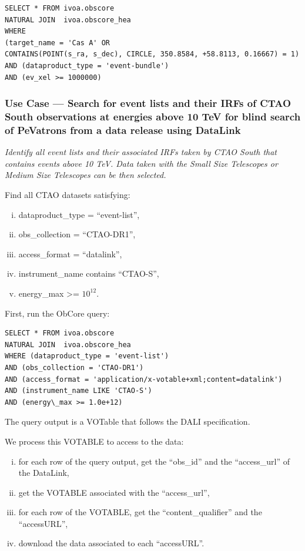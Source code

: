 \begin{verbatim}
SELECT * FROM ivoa.obscore
NATURAL JOIN  ivoa.obscore_hea
WHERE
(target_name = 'Cas A' OR
CONTAINS(POINT(s_ra, s_dec), CIRCLE, 350.8584, +58.8113, 0.16667) = 1)
AND (dataproduct_type = 'event-bundle')
AND (ev_xel >= 1000000)
\end{verbatim}


\subsubsection{Use Case --- Search for event lists and their \glspl{IRF} of CTAO South observations at energies above 10 TeV for blind search of PeVatrons from a data release using DataLink}

{\em Identify all event lists and their associated \glspl{IRF} taken by CTAO South that contains events above 10 TeV. Data taken with the Small Size Telescopes or Medium Size Telescopes can be then selected. \/}

\medskip
\noindent Find all CTAO datasets satisfying:
\begin{enumerate}[(i)]
  \item dataproduct\_type = ``event-list'',
  \item obs\_collection = ``CTAO-DR1'',
  \item access\_format = ``datalink'',
  \item instrument\_name contains ``CTAO-S'',
  \item energy\_max >= $10^{12}$.
\end{enumerate}

First, run the ObCore query:
\begin{verbatim}
SELECT * FROM ivoa.obscore
NATURAL JOIN  ivoa.obscore_hea
WHERE (dataproduct_type = 'event-list')
AND (obs_collection = 'CTAO-DR1')
AND (access_format = 'application/x-votable+xml;content=datalink')
AND (instrument_name LIKE 'CTAO-S')
AND (energy\_max >= 1.0e+12)
\end{verbatim}

The query output is a VOTable that follows the DALI specification.

We process this VOTABLE to access to the data:

\begin{enumerate}[(i)]
  \item for each row of the query output, get the ``obs\_id'' and the ``access\_url'' of the DataLink,
  \item get the VOTABLE associated with the ``access\_url'',
  \item for each row of the VOTABLE, get the ``content\_qualifier'' and the ``accessURL'',
  \item download the data associated to each ``accessURL''.
\end{enumerate}

